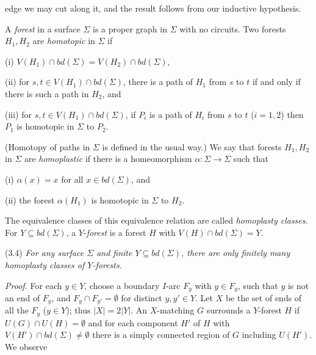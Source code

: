 \noindent edge we may cut along it, and the result follows from our inductive hypothesis.

A \textit{forest} in a surface $\Sigma$ is a proper graph in $\Sigma$ with no circuits. Two forests $H_1, H_2$ are \textit{homotopic} in $\Sigma$ if

\hspace*{12pt}(i) $V(H_1) \cap bd(\Sigma) = V(H_2) \cap bd(\Sigma)$,

\hspace*{12pt}(ii) for $s, t \in V(H_1) \cap bd(\Sigma)$, there is a path of $H_1$ from $s$ to $t$ if and only if there is such a path in $H_2$, and

\hspace*{12pt}(iii) for $s, t \in V(H_1) \cap bd(\Sigma)$, if $P_i$ is a path of $H_i$ from $s$ to $t$ ($i = 1, 2$) then $P_1$ is homotopic in $\Sigma$ to $P_2$.

(Homotopy of paths in $\Sigma$ is defined in the usual way.) We say that forests $H_1, H_2$ in $\Sigma$ are \textit{homoplastic} if there is a homeomorphism $\alpha \colon \Sigma \to \Sigma$ such that

\hspace*{12pt}(i) $\alpha(x) = x$ for all $x \in bd(\Sigma)$, and

\hspace*{12pt}(ii) the forest $\alpha(H_1)$ is homotopic in $\Sigma$ to $H_2$.

The equivalence classes of this equivalence relation are called \textit{homoplasty classes}. For $Y \subseteq bd(\Sigma)$, a $Y$-\textit{forest} is a forest $H$ with $V(H) \cap bd(\Sigma) = Y$.

\stmt
(3.4) \textit{For any surface $\Sigma$ and finite $Y \subseteq bd(\Sigma)$, there are only finitely many homoplasty classes of $Y$-forests.}

\textit{Proof.} For each $y \in Y$, choose a boundary $I$-arc $F_y$ with $y \in F_y$, such that $y$ is not an end of $F_y$, and $F_y \cap F_{y'} = \emptyset$ for distinct $y, y' \in Y$. Let $X$ be the set of ends of all the $F_y$ ($y \in Y$); thus $|X| = 2 |Y|$. An $X$-matching $G$ surrounds a $Y$-forest $H$ if $U(G) \cap U(H) = \emptyset$ and for each component $H'$ of $H$ with $V(H') \cap bd(\Sigma) \ne \emptyset$ there is a simply connected region of $G$ including $U(H')$. We observe

